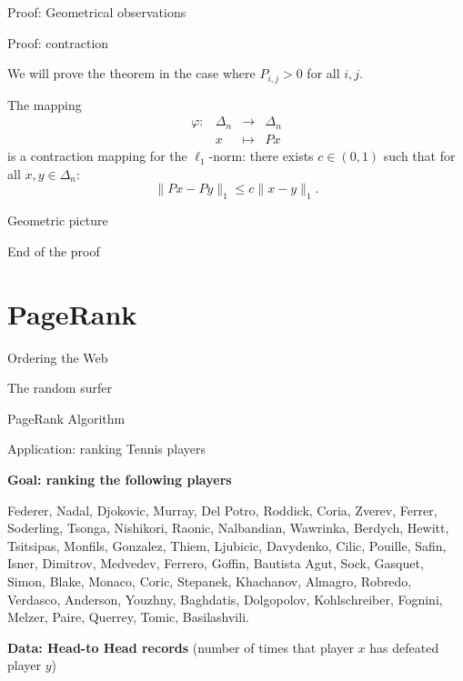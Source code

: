 \documentclass{beamer}
\begin{document}
\begin{frame}[t]{Proof: Geometrical observations}
	\grid

\end{frame}

\begin{frame}[t]{Proof: contraction}
	\grid

	\vspace{-0.3cm}
	We will prove the theorem in the case where $P_{i,j} > 0$ for all $i,j$.
	\vspace{-0.3cm}
	\begin{lemma}\label{lem:contract}
		The mapping 
		$$
		\begin{array}{cccc}
			\varphi:& \Delta_n &\to& \Delta_n \\
					& x & \mapsto & Px
		\end{array}
		$$
		is a contraction mapping for the $\ell_1$-norm: there exists $c \in (0,1)$ such that for all $x,y \in \Delta_n$:
		$$
		\| Px - Py \|_1 \leq c \| x-y\|_1.
		$$
	\end{lemma}

\end{frame}
\begin{frame}[t]{Geometric picture}
	\grid
\end{frame}
\begin{frame}[t]{End of the proof}
	\grid
	\pause
	\pause
\end{frame}

\section{PageRank}
\begin{frame}[t]{Ordering the Web}
	\grid
\end{frame}

\begin{frame}[t]{The random surfer}
	\grid
	\pause
\end{frame}

\begin{frame}[t]{PageRank Algorithm}
	\grid
\end{frame}

\begin{frame}[t]{Application: ranking Tennis players}
	\grid

	\textbf{Goal: ranking the following players}
	\begin{center}
		Federer, Nadal, Djokovic, Murray, Del Potro, Roddick, Coria, Zverev, Ferrer, Soderling, Tsonga, Nishikori, Raonic, Nalbandian, Wawrinka, Berdych, Hewitt, Tsitsipas, Monfils, Gonzalez, Thiem, Ljubicic, Davydenko, Cilic, Pouille, Safin, Isner, Dimitrov, Medvedev, Ferrero, Goffin, Bautista Agut, Sock, Gasquet, Simon, Blake, Monaco, Coric, Stepanek, Khachanov, Almagro, Robredo, Verdasco, Anderson, Youzhny, Baghdatis, Dolgopolov, Kohlschreiber, Fognini, Melzer, Paire, Querrey, Tomic, Basilashvili.
	\end{center}

	\textbf{Data: Head-to Head records} (number of times that player $x$ has defeated player $y$)

\end{frame}
\end{document}
